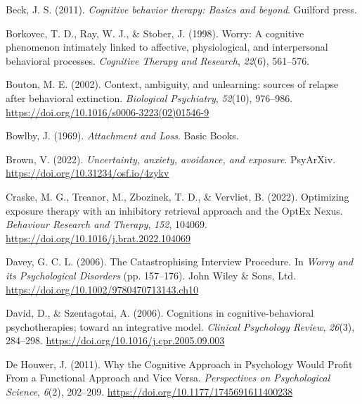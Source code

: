 \documentclass[
  man,floatsintext]{apa7}
\newlength{\cslhangindent}
\newlength{\cslentryspacingunit} %
\newenvironment{CSLReferences}[2] %
 {%
  \setlength{\parindent}{0pt}
  \ifodd #1
  \let\oldpar\par
  \def\par{\hangindent=\cslhangindent\oldpar}
  \fi
  \setlength{\parskip}{#2\cslentryspacingunit}
 }%
 {}
\begin{document}
\begin{CSLReferences}{1}{0}
\leavevmode{}%
Beck, J. S. (2011). \emph{Cognitive behavior therapy: Basics and beyond}. Guilford press.

\leavevmode{}%
Borkovec, T. D., Ray, W. J., \& Stober, J. (1998). Worry: A cognitive phenomenon intimately linked to affective, physiological, and interpersonal behavioral processes. \emph{Cognitive Therapy and Research}, \emph{22}(6), 561--576.

\leavevmode{}%
Bouton, M. E. (2002). Context, ambiguity, and unlearning: sources of relapse after behavioral extinction. \emph{Biological Psychiatry}, \emph{52}(10), 976--986. \url{https://doi.org/10.1016/s0006-3223(02)01546-9}

\leavevmode{}%
Bowlby, J. (1969). \emph{Attachment and Loss}. Basic Books.

\leavevmode{}%
Brown, V. (2022). \emph{Uncertainty, anxiety, avoidance, and exposure}. PsyArXiv. \url{https://doi.org/10.31234/osf.io/4zykv}

\leavevmode{}%
Craske, M. G., Treanor, M., Zbozinek, T. D., \& Vervliet, B. (2022). Optimizing exposure therapy with an inhibitory retrieval approach and the OptEx Nexus. \emph{Behaviour Research and Therapy}, \emph{152}, 104069. \url{https://doi.org/10.1016/j.brat.2022.104069}

\leavevmode{}%
Davey, G. C. L. (2006). The Catastrophising Interview Procedure. In \emph{Worry and its Psychological Disorders} (pp. 157--176). John Wiley \& Sons, Ltd. \url{https://doi.org/10.1002/9780470713143.ch10}

\leavevmode{}%
David, D., \& Szentagotai, A. (2006). Cognitions in cognitive-behavioral psychotherapies; toward an integrative model. \emph{Clinical Psychology Review}, \emph{26}(3), 284--298. \url{https://doi.org/10.1016/j.cpr.2005.09.003}

\leavevmode{}%
De Houwer, J. (2011). Why the Cognitive Approach in Psychology Would Profit From a Functional Approach and Vice Versa. \emph{Perspectives on Psychological Science}, \emph{6}(2), 202--209. \url{https://doi.org/10.1177/1745691611400238}


\end{CSLReferences}
\end{document}

